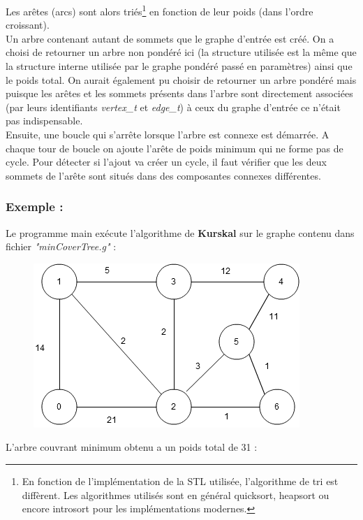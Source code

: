 \documentclass[12pt]{article}
\begin{document}
Les arêtes (arcs) sont alors triés\footnote{En fonction de l'implémentation de la STL utilisée, l'algorithme de tri est diffèrent. Les algorithmes utilisés sont en général quicksort, heapsort ou encore introsort pour les implémentations modernes.} en fonction de leur poids (dans l'ordre croissant).\\ 

Un arbre contenant autant de sommets que le graphe d'entrée est créé. On a choisi de retourner un arbre non pondéré ici (la structure utilisée est la même que la structure interne utilisée par le graphe pondéré passé en paramètres) ainsi que le poids total. On aurait également pu choisir de retourner un arbre pondéré mais puisque les arêtes et les sommets présents dans l'arbre sont directement associées (par leurs identifiants {\it vertex\_t} et {\it edge\_t}) à ceux du graphe d'entrée ce n'était pas indispensable.\\ 

Ensuite, une boucle qui s'arrête lorsque l'arbre est connexe est démarrée. A chaque tour de boucle on ajoute l'arête de poids minimum qui ne forme pas de cycle. Pour détecter si l'ajout va créer un cycle, il faut vérifier que les deux sommets de l'arête sont situés dans des composantes connexes différentes.\\ 

\clearpage
\subsubsection{Exemple :}
Le programme main exécute l'algorithme de {\bf Kurskal} sur le graphe contenu dans fichier {\it "minCoverTree.g"} : \\
\begin{figure}[h]
\centering
\includegraphics[scale=.7]{imgs/schema1.png}
\end{figure}

L'arbre couvrant minimum obtenu a un poids total de 31 :\\
\end{document}

